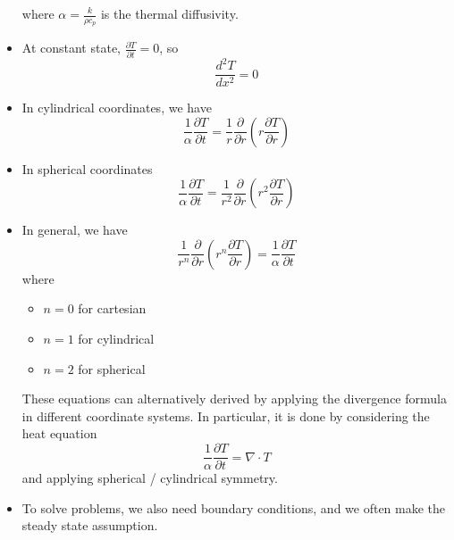\documentclass{article}
\begin{document}
\begin{itemize}
\begin{equation}
        \end{equation}
        where $\alpha=\frac{k}{\rho c_p}$ is the thermal diffusivity.
        \item At constant state, $\frac{\partial T}{\partial t} = 0$, so 
        \begin{equation}
            \frac{d^2 T}{dx^2} = 0
        \end{equation}
        \item In cylindrical coordinates, we have
        \begin{equation}
            \frac{1}{\alpha}\frac{\partial T}{\partial t} = \frac{1}{r}\frac{\partial}{\partial r}\left(r\frac{\partial T}{\partial r}\right)
        \end{equation}
        \item In spherical coordinates 
        \begin{equation}
            \frac{1}{\alpha}\frac{\partial T}{\partial t} = \frac{1}{r^2}\frac{\partial}{\partial r}\left(r^2 \frac{\partial T}{\partial r}\right)
        \end{equation}
        \item In general, we have 
        \begin{equation}
            \frac{1}{r^n}\frac{\partial}{\partial r}\left(r^n \frac{\partial T}{\partial r}\right) = \frac{1}{\alpha}\frac{\partial T}{\partial t}
        \end{equation}
        where 
        \begin{itemize}
            \item $n=0$ for cartesian
            \item $n=1$ for cylindrical 
            \item $n=2$ for spherical
        \end{itemize}
        \begin{idea}
            These equations can alternatively derived by applying the divergence formula in different coordinate systems. In particular, it is done by considering the heat equation 
            \begin{equation}
                \frac{1}{\alpha}\frac{\partial T}{\partial t} = \nabla \cdot T
            \end{equation}
            and applying spherical / cylindrical symmetry.
        \end{idea}
        \item To solve problems, we also need boundary conditions, and we often make the steady state assumption.
    \end{itemize}
\end{document}

